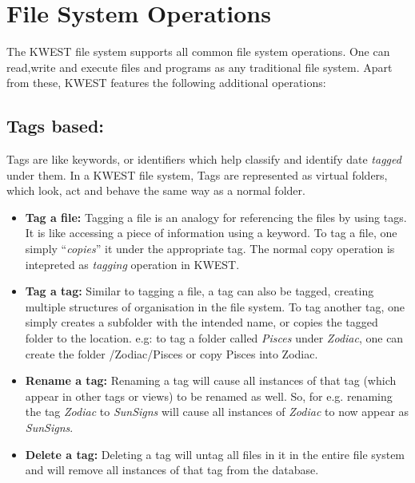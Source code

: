 \section{File System Operations}
The KWEST file system supports all common file system operations. One can read,write and execute files and programs as any traditional file system. Apart from these, KWEST features the following additional operations:

\subsection{Tags based:}
Tags are like keywords, or identifiers which help classify and identify date \textit{tagged} under them. 
In a KWEST file system, Tags are represented as virtual folders, which look, act and behave the same way as a normal folder.
\begin{itemize} 
\item \textbf{Tag a file:} \newline
Tagging a file is an analogy for referencing the files by using tags. It is like accessing a piece of information using a keyword.
To tag a file, one simply ``\textit{copies}'' it under the appropriate tag. The normal copy operation is intepreted as \textit{tagging} operation in KWEST.
\item \textbf{Tag a tag:} \newline
Similar to tagging a file, a tag can also be tagged, creating multiple structures of organisation in the file system. To tag another tag, one simply creates a subfolder with the intended name, or copies the tagged folder to the location. \newline
e.g: to tag a folder called \textit{Pisces} under \textit{Zodiac}, one can create the folder /Zodiac/Pisces or copy Pisces into Zodiac.
\item \textbf{Rename a tag:} \newline
Renaming a tag will cause all instances of that tag  (which appear in other tags or views) to be renamed as well. So, for e.g. renaming the tag \textit{Zodiac} to \textit{SunSigns} will cause all instances of \textit{Zodiac} to now appear as \textit{SunSigns}.
\item \textbf{Delete a tag:} \newline
Deleting a tag will untag all files in it in the entire file system and will remove all instances of that tag from the database. 
\end{itemize}

